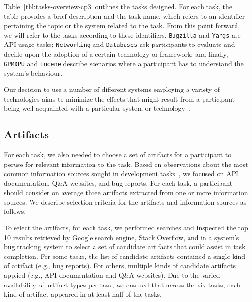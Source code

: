 Table~\ref{tbl:tasks-overview-cp3} outlines the tasks designed.
For each task, the table provides a brief description and the task name, which refers to an identifier pertaining the topic or the system related to the task.
From this point forward, we will refer to the tasks according to these identifiers.
\texttt{Bugzilla} and \texttt{Yargs} are API usage tasks; \texttt{Networking} and \texttt{Databases} ask participants to evaluate and decide upon the adoption of a certain technology or framework; and finally, \texttt{GPMDPU} and \texttt{Lucene} describe scenarios where a participant 
has to understand the system's behaviour. 


Our decision to use a number of different systems employing
a variety of technologies aims to minimize the effects that might result from a participant being
well-acquainted with a particular system or technology~\cite{Wildemuth2012, DeGraaf2014}. 







\subsection{Artifacts}
\label{cp3:method-artifacts}



For each task, we also needed to choose a set of artifacts for a
participant to peruse for relevant information to the task.  Based on
observations about the most common information sources sought in
development tasks~\cite{Li2013, Ponzanelli2017},
we focused on API documentation, Q\&A websites, and
bug reports.
For each task, a participant should consider on average three artifacts extracted
from one or more information sources.
We describe selection criteria for the artifacts and information sources as follows.



To select the artifacts, for each task, we performed
searches and inspected the top 10 results retrieved by Google search engine, Stack Overflow, and in a
system's bug tracking system to select a set of candidate artifacts that could
assist in task completion.
For some tasks, the list of candidate
artifacts contained a single kind of artifact (e.g., bug
reports). For others, multiple kinds of candidate artifacts applied
(e.g., API documentation and Q\&A websites). 
Due to the varied availability of artifact types per task, 
we ensured that across
the six tasks, each kind of artifact appeared in at least half of the
tasks.



